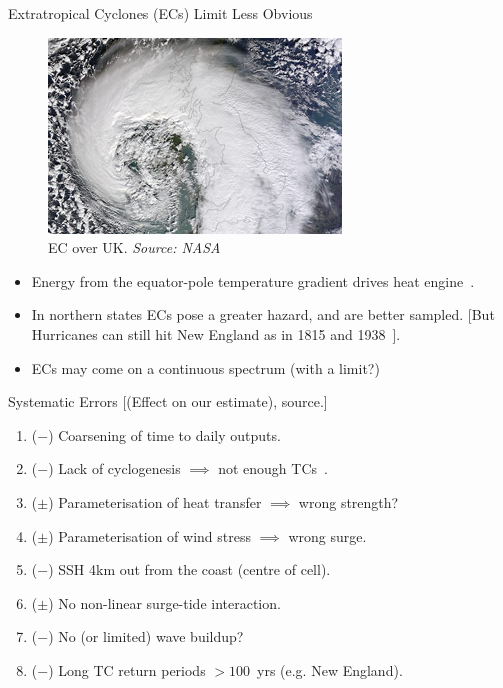 \begin{frame}{Extratropical Cyclones (ECs) Limit Less Obvious}
\begin{figure}[htb!]
\includegraphics[width=0.4\linewidth]{images/ukstorm_tmo_2014043_tn.jpg}\\
EC over UK. \textit{Source: NASA}
\end{figure}
\begin{itemize}
\item Energy from the equator-pole temperature gradient
      drives heat engine~\cite{lorenz1960energy, holton2004introduction}.
\item In northern states  ECs pose a greater hazard, and are better sampled.
[But Hurricanes can still hit
 New England as in 1815 and 1938~\cite{emanuel2005divine}].
\item ECs may come on a continuous spectrum (with a limit?)
\end{itemize}
\end{frame}

\begin{frame}{Systematic Errors}
[(Effect on our estimate), source.]
\begin{enumerate}
\item ($-$) Coarsening of time to daily outputs.
\item ($-$) Lack of cyclogenesis  $\implies$ not enough TCs~\cite{tomassini2017interaction, williams2018met, FurtherInfo}.
\item ($\pm$) Parameterisation of heat transfer $\implies$ wrong strength?
\item ($\pm$) Parameterisation of wind stress $\implies$ wrong surge.
\item ($-$) SSH 4km out from the coast (centre of cell).
\item ($\pm$) No non-linear surge-tide interaction.
\item ($-$) No (or limited) wave buildup?
\item ($-$) Long TC return periods $> 100$~yrs (e.g. New England).
\end{enumerate}

\end{frame}
